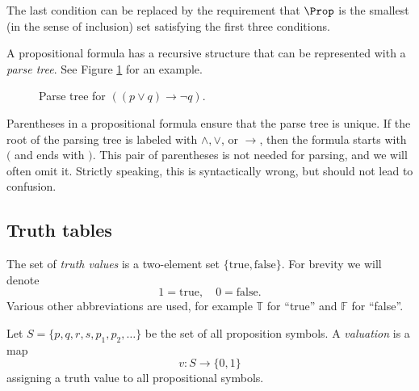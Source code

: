 \begin{page}
\setcounter{section}{1}
\setcounter{subsection}{2}
\setcounter{dfn}{1}
\label{portion:407}

The last condition can be replaced by the requirement that $\Prop$ is the smallest (in the sense of inclusion) set satisfying the first three conditions.

A propositional formula has a recursive structure that can be represented with a \emph{parse tree}.
See Figure \ref{fig:ParseTreeProp} for an example.

\begin{figure}[ht]
\begin{center}

\end{center}
\caption{Parse tree for $((p \vee q) \to \neg q)$.}
\label{fig:ParseTreeProp}
\end{figure}

Parentheses in a propositional formula ensure that the parse tree is unique.
If the root of the parsing tree is labeled with $\wedge, \vee$, or $\to$, then the formula starts with $($ and ends with $)$.
This pair of parentheses is not needed for parsing, and we will often omit it.
Strictly speaking, this is syntactically wrong, but should not lead to confusion.



\end{page}

\begin{page}
\setcounter{section}{1}
\setcounter{subsection}{2}
\setcounter{dfn}{1}
\label{portion:409}

\subsection{Truth tables}
The set of \emph{truth values} is a two-element set $\{\text{true}, \text{false}\}$.
For brevity we will denote
\[
1 = \text{true}, \quad 0 = \text{false}.
\]
Various other abbreviations are used, for example $\mathbb{T}$ for ``true'' and $\mathbb{F}$ for ``false''.


\end{page}

\begin{page}
\setcounter{section}{1}
\setcounter{subsection}{2}
\setcounter{dfn}{2}
\label{portion:411}

\begin{dfn}
Let $S = \{p, q, r, s, p_1, p_2, \ldots\}$ be the set of all proposition symbols.
A \emph{valuation} is a map
\[
v \colon S \to \{0,1\}
\]
assigning a truth value to all propositional symbols.
\end{dfn}

\end{page}

